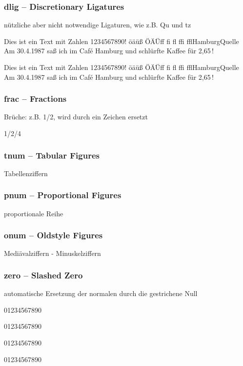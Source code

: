 \documentclass{fontdoku}
\def\TEXT{%
Dies ist ein Text mit Zahlen 1234567890!\newline%
öäüß ÖÄÜ\quad ff fi fl ffi ffl\quad Hamburg\quad Quelle\newline%
Am 30.4.1987 saß ich im \glqq{}Caf\'e Hamburg\grqq{} und schlürfte Kaffee für 2,65\,\libertineEuro!
}
\def\ZAHL{01234567890}
\begin{document}
\subsubsection*{dlig -- Discretionary Ligatures}

nützliche aber nicht notwendige Ligaturen, wie z.B. Qu und tz

\begin{lstsample}[hpos=l,lstsize=0.4,codesize=0.4,toprule,bottomrule]
\TEXT

\TEXT
\end{lstsample}





\subsubsection*{frac -- Fractions}

Brüche: z.B. 1/2, wird durch ein Zeichen ersetzt

\begin{lstsample}[hpos=l,lstsize=0.4,codesize=0.4,toprule,bottomrule]
1/2/4
\end{lstsample}



\subsubsection*{tnum -- Tabular Figures}
Tabellenziffern

\subsubsection*{pnum -- Proportional Figures}
proportionale Reihe

\subsubsection*{onum -- Oldstyle Figures}
Mediävalziffern - Minuskelziffern

\subsubsection*{zero -- Slashed Zero}
automatische Ersetzung der normalen durch die gestrichene Null

\begin{lstsample}[hpos=l,lstsize=0.4,codesize=0.4,toprule,bottomrule]
\ZAHL

\ZAHL

\ZAHL

\ZAHL
\end{lstsample}
\end{document}
